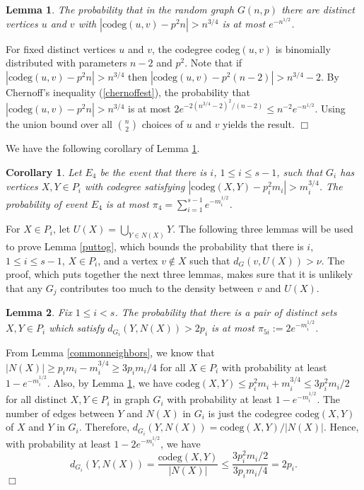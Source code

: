 \documentclass[11pt]{article}
\newtheorem{lemma}{Lemma}[section]
\newtheorem{corollary}{Corollary}[section]
\newenvironment{proof}
      {\medskip\noindent{\bf Proof:}\hspace{1mm}}
      {\hfill$\Box$\medskip}
\begin{document}
\begin{lemma} \label{commonneighbors2}
The probability that in the random graph $G(n,p)$ there are
distinct vertices $u$ and $v$ with $|\textrm{codeg}(u,v) - p^2 n| > n^{3/4}$ is
at most $e^{-n^{1/2}}$.
\end{lemma}
\begin{proof}
For fixed distinct vertices $u$ and $v$, the codegree codeg$(u,v)$ is
binomially distributed with parameters $n-2$ and $p^2$. Note that if
$|\textrm{codeg}(u,v) - p^2 n| > n^{3/4}$ then $|\textrm{codeg}(u,v) - p^2
(n-2)| > n^{3/4}-2$. By Chernoff's inequality (\ref{chernoffest}), the
probability that $|\textrm{codeg}(u,v) - p^2 n| > n^{3/4}$ is at most
$2e^{-2(n^{3/4}-2)^2/(n-2)} \leq n^{-2}e^{-n^{1/2}}$. Using the union bound
over all ${n \choose 2}$ choices of $u$ and $v$ yields the result.
\end{proof}

We have the following corollary of Lemma \ref{commonneighbors2}.

\begin{corollary}\label{commonneighbors2cor}
Let $E_4$ be the event that there is $i$, $1 \leq i \leq s-1$, such that $G_i$
has vertices $X,Y \in P_i$ with codegree satisfying
$|\textrm{codeg}(X,Y)-p_i^2m_i|>m_i^{3/4}$.
The probability of event $E_4$ is at most $\pi_4=\sum_{i=1}^{s-1}
e^{-m_i^{1/2}}$.
\end{corollary}

For $X \in P_i$, let $U(X)=\bigcup_{Y \in N(X)} Y$. The following three lemmas
will be used to prove Lemma \ref{puttog}, which bounds the probability that
there is $i$, $1 \leq i \leq s-1$, $X \in P_i$, and a vertex $v \not \in X$
such
that $d_G(v,U(X)) > \nu$. The proof, which puts together the next three lemmas,
makes
sure that it is unlikely that any $G_{j}$  contributes too much to the density
between $v$ and $U(X)$.

\begin{lemma}\label{puttog3}
Fix $1 \leq i < s$. The probability that there is a pair of distinct sets $X,Y
\in P_i$ which satisfy $d_{G_i}(Y,N(X)) > 2p_i$ is at most
$\pi_{5i}:=2e^{-m_i^{1/2}}$.
\end{lemma}
\begin{proof}
From Lemma \ref{commonneighbors}, we know that $|N(X)| \geq p_im_i-m_i^{3/4}
\geq 3 p_i m_i/4$ for all $X \in P_i$ with probability at least $1
-e^{-m_i^{1/2}}$. Also, by Lemma \ref{commonneighbors2}, we have
$\textrm{codeg}(X,Y) \leq p_i^2m_i+m_i^{3/4} \leq 3 p_i^2 m_i/2$ for all
distinct $X, Y \in P_i$ in graph $G_i$ with probability at least $1
-e^{-m_i^{1/2}}$. The number of edges between $Y$ and $N(X)$ in $G_i$ is just
the codegree $\textrm{codeg}(X,Y)$ of $X$ and $Y$ in $G_i$. Therefore,
$d_{G_i}(Y,N(X)) = \textrm{codeg}(X,Y)/|N(X)|$. Hence, with probability at
least $1 - 2e^{-m_i^{1/2}}$, we have
\[d_{G_i}(Y,N(X)) = \frac{\textrm{codeg}(X,Y)}{|N(X)|} \leq \frac{3p_i^2
m_i/2}{3p_i m_i/4} = 2 p_i.\]
\end{proof}
\end{document}
